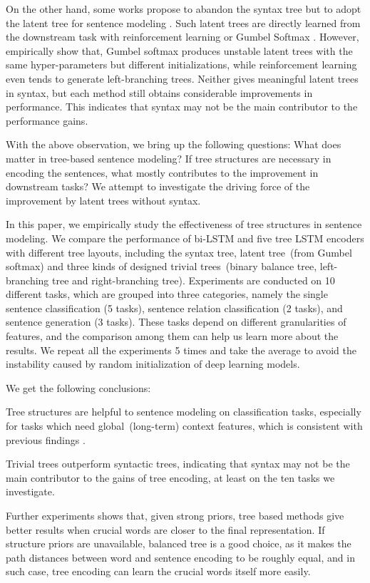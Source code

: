 \documentclass[11pt,a4paper]{article}
\begin{document}
On the other hand, some works propose to abandon the syntax tree 
but to adopt the latent tree for sentence modeling \cite{choi2017learning,yogatama2017learning,maillard2017jointly,williams2018latent}. 
Such latent trees are directly learned from the downstream task with reinforcement learning \cite{williams1992simple} or Gumbel Softmax \cite{jang2016categorical,maddison2016concrete}.
However,  empirically show that, Gumbel softmax produces unstable latent trees with the same hyper-parameters but different initializations, while reinforcement learning \cite{williams2018latent} even tends to generate left-branching trees.
Neither gives meaningful latent trees in syntax, but each method still obtains considerable improvements in performance.
This indicates that syntax may not be the main contributor to the performance gains.

With the above observation, we bring up the following questions: 
What does matter in tree-based sentence modeling?
If tree structures are necessary in encoding the sentences, what mostly contributes to the improvement in downstream tasks?
We attempt to investigate the driving force of the improvement by latent trees without syntax. 

In this paper, we empirically study the effectiveness of tree structures in sentence modeling. 
We compare the performance of bi-LSTM and five tree LSTM encoders with different tree layouts, including the syntax tree, latent tree~(from Gumbel softmax) and three kinds of designed trivial trees~(binary balance tree, left-branching tree and right-branching tree).
Experiments are conducted on 10 different tasks, which are grouped into three categories, namely the single sentence classification (5 tasks), sentence relation classification (2 tasks), and sentence generation (3 tasks).
These tasks depend on different granularities of features, and the comparison among them can help us learn more about the results.
We repeat all the experiments 5 times and take the average to avoid the instability caused by random initialization of deep learning models.

We get the following conclusions:
\begin{compactitem}
\item Tree structures are helpful to sentence modeling on classification tasks, especially for tasks which need global~(long-term) context features, which is consistent with previous findings \cite{li2015tree}.
\item Trivial trees outperform syntactic trees, indicating that syntax may not be the main contributor to the gains of tree encoding, at least on the ten tasks we investigate.
\item Further experiments shows that, given strong priors, tree based methods give better results when crucial words are closer to the final representation. If structure priors are unavailable, balanced tree is a good choice, as it makes the path distances between word and sentence encoding to be roughly equal, and in such case, tree encoding can learn the crucial words itself more easily.  
\end{compactitem}
\end{document}
